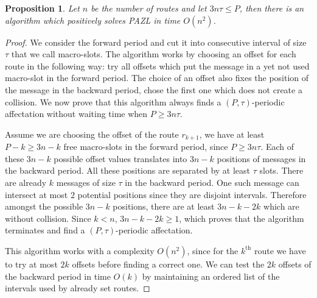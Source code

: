 \documentclass[a4paper,10pt]{article}
\newtheorem{proposition}{Proposition}
\begin{document}
    \begin{proposition}
    Let  $n$ be the number of routes and let $ 3n\tau \leq P$, then there is an algorithm which positively solves PAZL in time $O(n^2)$.
    \end{proposition}
    \begin{proof}
     We consider the forward period and cut it into consecutive interval of size $\tau$ that we call macro-slots. The algorithm works by choosing an offset for each route in the following way: try all offsets which put the message in a yet not used macro-slot in the forward
     period. The choice of an offset also fixes the position of the message in the backward period, chose the first one which does not create a collision. We now prove that this algorithm always finds a $(P,\tau)$-periodic affectation without waiting time when $P \geq 3n\tau$.
     
     Assume we are choosing the offset of the route $r_{k+1}$, we have at least $P - k \geq 3n - k$ free macro-slots in the forward period, since $P \geq 3n\tau$. Each of these $3n - k$ possible offset values translates into $3n - k$ positions of messages in the backward period. All these positions are separated by at least $\tau$ slots. There are already $k$ messages of size $\tau$ in the backward period. One such message can intersect at most $2$ potential positions since they are disjoint intervals. Therefore  amongst the possible $3n - k$ positions, there are  at least $3n - k -2k$ which are without collision. Since $k < n$, $3n - k -2k \geq 1$, which proves that the algorithm terminates and find a  $(P,\tau)$-periodic affectation. 
     
     This algorithm works with a complexity $O(n^2)$, since for the $k^{\text{th}}$ route we have to try at most $2k$ offsets before finding a correct one. We can test the $2k$ offsets of the backward period in time $O(k)$ by maintaining an ordered list of the intervals used by already set routes.
     \end{proof}
     
\end{document}
